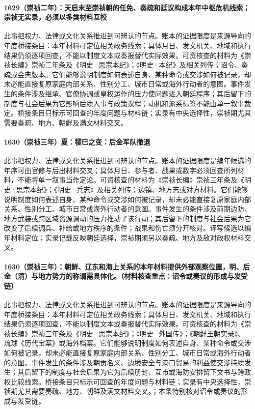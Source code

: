 \paragraph{1629（崇祯二年）：天启末至崇祯朝的任免、奏疏和廷议构成本年中枢危机线索；崇祯无实录，必须以多类材料互校} 此事把权力、法律或文化关系推进到可辨认的节点。账本的证据限度是来源导向的年度桥接条目：本年材料可定位相关政务线索；具体月日、发文机关、地域和执行结果仍须逐项回查，不能以制度文本或奏报替代实际效果。可资核查的材料为《崇祯长编》崇祯二年条及《明史·思宗本纪》；《明史·本纪》及相关列传；诏令、奏疏或会典版本。它们能够说明制度如何表述自身、某种命令或交涉如何被记录，却未必能直接复原家庭内部关系、性别分工、城市日常或海外行动者的意图。事件发生的条件涉及继承、官僚协调或皇权运作的压力使问题进入朝廷程序；其后留下的制度与社会后果为它影响后续人事与政策议程；动机和派系标签不能由单一叙事裁定。桥接条目只标示可回查的年度问题与材料链；实录有中央选择性，崇祯期尤其需要奏疏、地方、朝鲜及满文材料交叉。

\paragraph{1630（崇祯三年）夏：稷巳之变：后金军队撤退} 此事把权力、法律或文化关系推进到可辨认的节点。账本的证据限度是编年候选的年序可由官修与后出材料交叉；具体月日、参与者、战果或数字必须回查所列材料，不能将单一叙事当作定论。可资核查的材料为《崇祯长编》崇祯三年条及《明史·思宗本纪》；《明史·兵志》及相关列传；边镇、地方志或对方材料。它们能够说明制度如何表述自身、某种命令或交涉如何被记录，却未必能直接复原家庭内部关系、性别分工、城市日常或海外行动者的意图。事件发生的条件涉及前期边防、地方武装或跨区域资源调动的压力推动了该行动；其后留下的制度与社会后果为它改变了后续调兵、补给或地方秩序的条件；战果和伤亡须分开核对。译写候选以编年材料定位；实录记载反映朝廷选择，崇祯期须另以奏疏、地方及敌对政权材料交叉。

\paragraph{1630（崇祯三年）：朝鲜、辽东和海上关系的本年材料提供外部观察位置，明、后金（清）与地方势力的称谓需具体化。（材料核查重点：诏令或奏议的形成与发受链）} 此事把权力、法律或文化关系推进到可辨认的节点。账本的证据限度是来源导向的年度桥接条目：本年材料可定位相关政务线索；具体月日、发文机关、地域和执行结果仍须逐项回查，不能以制度文本或奏报替代实际效果。可资核查的材料为《崇祯长编》崇祯三年条及《明史·思宗本纪》；《明史·外国传》；《朝鲜王朝实录》、琉球《历代宝案》或海外档案。它们能够说明制度如何表述自身、某种命令或交涉如何被记录，却未必能直接复原家庭内部关系、性别分工、城市日常或海外行动者的意图。事件发生的条件涉及朝贡名义、边境安全与港口贸易的利益使交涉持续发生；其后留下的制度与社会后果为它为后续册封、互市或海防安排留下文书与跨政权比较线索。桥接条目只标示可回查的年度问题与材料链；实录有中央选择性，崇祯期尤其需要奏疏、地方、朝鲜及满文材料交叉。；本条特别核对诏令或奏议的形成与发受链。

